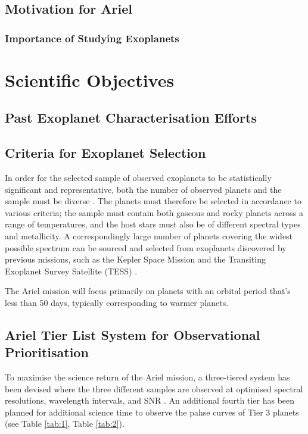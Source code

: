 \documentclass[12pt]{article}
\begin{document}
\subsection{Motivation for Ariel}



\subsubsection{Importance of Studying Exoplanets}


\newpage

\section{Scientific Objectives}

\subsection{Past Exoplanet Characterisation Efforts}



\subsection{Criteria for Exoplanet Selection}

In order for the selected sample of observed exoplanets to be statistically significant and representative, both the number of observed planets and the sample must be diverse \cite{zingales2018ariel}.
The planets must therefore be selected in accordance to various criteria; the sample must contain both gaseous and rocky planets across a range of temperatures, and the host stars must also be of
different spectral types and metallicity. A correspondingly large number of planets covering the widest possible spectrum can be sourced and selected from exoplanets discovered by previous missions, such as
the Kepler Space Mission \cite{zingales2018ariel} and the Transiting Exoplanet Survey Satellite (TESS) \cite{arielTESScandidates}.

The Ariel mission will focus primarily on planets with an orbital period that's less than 50 days, typically corresponding to warmer planets. 

\subsection{Ariel Tier List System for Observational Prioritisation}

To maximise the science return of the Ariel mission, a three-tiered system has been devised where the three different samples are observed at optimised spectral resolutions, wavelength intervals,
and SNR \cite{salvignol2024ariel}. An additional fourth tier has been planned for additional science time to observe the pahse curves of Tier 3 planets \cite{arielstudyreport} (see Table \ref{tab:1}, Table \ref{tab:2}).
\end{document}

